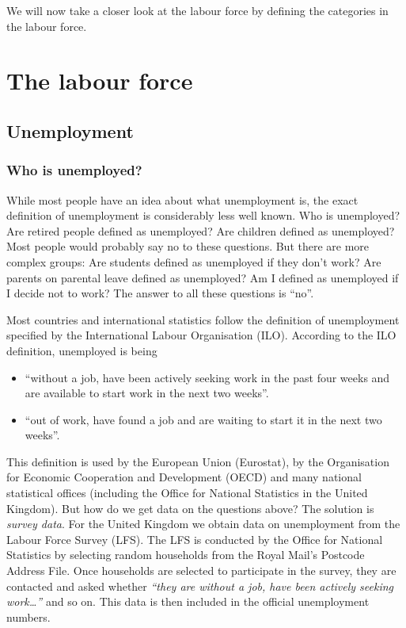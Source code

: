 \documentclass[
]{book}
\providecommand{\tightlist}{%
  \setlength{\itemsep}{0pt}\setlength{\parskip}{0pt}}
\begin{document}
We will now take a closer look at the labour force by defining the categories in the labour force.

\hypertarget{the-labour-force}{%
\section{The labour force}\label{the-labour-force}}

\hypertarget{unemployment}{%
\subsection*{Unemployment}\label{unemployment}}

\hypertarget{who-is-unemployed}{%
\subsubsection*{Who is unemployed?}\label{who-is-unemployed}}

While most people have an idea about what unemployment is, the exact definition of unemployment is considerably less well known. Who is unemployed? Are retired people defined as unemployed? Are children defined as unemployed? Most people would probably say no to these questions. But there are more complex groups: Are students defined as unemployed if they don't work? Are parents on parental leave defined as unemployed? Am I defined as unemployed if I decide not to work? The answer to all these questions is ``no''.

Most countries and international statistics follow the definition of unemployment specified by the International Labour Organisation (ILO). According to the ILO definition, unemployed is being

\begin{itemize}
\tightlist
\item
  ``without a job, have been actively seeking work in the past four weeks and are available to start work in the next two weeks''.
\item
  ``out of work, have found a job and are waiting to start it in the next two weeks''.
\end{itemize}

This definition is used by the European Union (Eurostat), by the Organisation for Economic Cooperation and Development (OECD) and many national statistical offices (including the Office for National Statistics in the United Kingdom). But how do we get data on the questions above? The solution is \emph{survey data}. For the United Kingdom we obtain data on unemployment from the Labour Force Survey (LFS). The LFS is conducted by the Office for National Statistics by selecting random households from the Royal Mail's Postcode Address File. Once households are selected to participate in the survey, they are contacted and asked whether \emph{``they are without a job, have been actively seeking work\ldots{}''} and so on. This data is then included in the official unemployment numbers.
\end{document}
